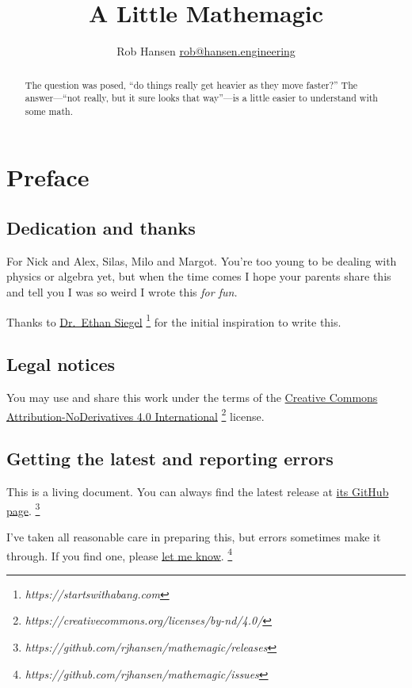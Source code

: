 \documentclass[10pt,letterpaper,oneside,notitlepage]{article}
\begin{document}
\title{A Little Mathemagic}
\author{Rob Hansen \href{mailto:rob@hansen.engineering?subject=A\%20Little\%20Mathemagic}{\textlangle rob@hansen.engineering\textrangle}}
\maketitle
\tableofcontents
\begin{abstract}
  \noindent
  The question was posed, ``do things really get heavier as they move
faster?'' The answer---``not really, but it sure looks that way''---is a
little easier to understand with some math.
\end{abstract}

\section{Preface}
\subsection{Dedication and thanks}
For Nick and Alex, Silas, Milo and Margot. You're too young to be dealing
with physics or algebra yet, but when the time comes I hope your parents
share this and tell you I was so weird I wrote this \textit{for fun.}

Thanks to \href{https://startswithabang.com}{Dr.~Ethan Siegel}
\footnote{\textit{https://startswithabang.com}} for the
initial inspiration to write this.

\subsection{Legal notices}
You may use and share this work under the terms of the 
\href{https://creativecommons.org/licenses/by-nd/4.0/}{Creative Commons Attribution-NoDerivatives 4.0 International}
\footnote{\textit{https://creativecommons.org/licenses/by-nd/4.0/}} license.

\subsection{Getting the latest and reporting errors}
This is a living document. You can always find the latest release at 
\href{https://github.com/rjhansen/mathemagic/releases}{its GitHub page}.
\footnote{\textit{https://github.com/rjhansen/mathemagic/releases}}

I've taken all reasonable care in preparing this, but errors sometimes
make it through. If you find one, please
\href{https://github.com/rjhansen/mathemagic/issues}{let me know}.
\footnote{\textit{https://github.com/rjhansen/mathemagic/issues}}
\end{document}
